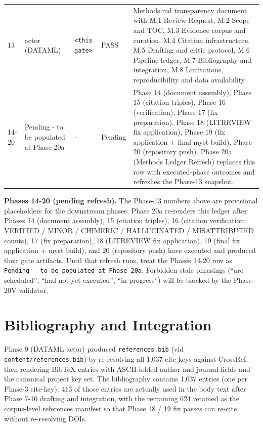 \documentclass[11pt]{article}
\begin{document}
\begin{tabular}{p{}p{}p{}p{}p{}}
13 & actor (DATAML) & \texttt{\textless this gate\textgreater } & PASS & Methods.md transparency document with M.1 Review Request, M.2 Scope and TOC, M.3 Evidence corpus and curation, M.4 Citation infrastructure, M.5 Drafting and critic protocol, M.6 Pipeline ledger, M.7 Bibliography and integration, M.8 Limitations, reproducibility and data availability \\
14-20 & Pending - to be populated at Phase 20a & \texttt{-} & Pending & Phase 14 (document assembly), Phase 15 (citation triples), Phase 16 (verification), Phase 17 (fix preparation), Phase 18 (LITREVIEW fix application), Phase 19 (fix application + final myst build), Phase 20 (repository push). Phase 20a (Methods Ledger Refresh) replaces this row with executed-phase outcomes and refreshes the Phase-13 snapshot. \\
\bottomrule
\end{tabular}

\bigskip

\textbf{Phases 14-20 (pending refresh).} The Phase-13 numbers above are provisional placeholders for the downstream phases; Phase 20a re-renders this ledger after Phases 14 (document assembly), 15 (citation triples), 16 (citation verification: VERIFIED / MINOR / CHIMERIC / HALLUCINATED / MISATTRIBUTED counts), 17 (fix preparation), 18 (LITREVIEW fix application), 19 (final fix application + myst build), and 20 (repository push) have executed and produced their gate artifacts. Until that refresh runs, treat the Phases 14-20 row as \texttt{Pending - to be populated at Phase 20a}. Forbidden stale phrasings (``are scheduled'', ``had not yet executed'', ``in progress'') will be blocked by the Phase-20V validator.

\section{Bibliography and Integration}\label{sec-methods-bibliography-integration}

Phase 9 (DATAML actor) produced \texttt{references.bib} (vid \texttt{content/references.bib}) by re-resolving all 1,037 cite-keys against CrossRef, then rendering BibTeX entries with ASCII-folded author and journal fields and the canonical project key set. The bibliography contains 1,037 entries (one per Phase-3 cite-key); 413 of those entries are actually used in the body text after Phase 7-10 drafting and integration, with the remaining 624 retained as the corpus-level references manifest so that Phase 18 / 19 fix passes can re-cite without re-resolving DOIs.
\end{document}
